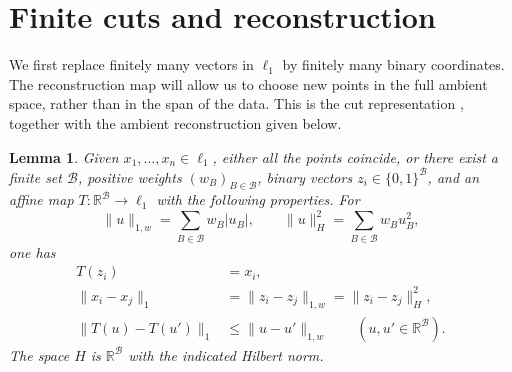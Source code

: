 \documentclass[11pt]{article}
\newtheorem{lemma}[theorem]{Lemma}
\theoremstyle{definition}
\theoremstyle{remark}
\numberwithin{equation}{section}
\newcommand{\R}{\mathbb R}
\begin{document}
\section{Finite cuts and reconstruction}
\label{sec:cuts}

We first replace finitely many vectors in $\ell_1$ by finitely many
binary coordinates. The reconstruction map will allow us to
choose new points in the full ambient space, rather than in the
span of the data. This is the cut representation
\cite[Chapter~4]{DezaLaurent97}, together with the ambient reconstruction
given below.

\begin{lemma}\label{lem:cuts}
Given $x_1,\ldots,x_n\in\ell_1$, either all the points coincide,
or there exist a finite set $\mathcal B$, positive weights
$(w_B)_{B\in\mathcal B}$, binary vectors
$z_i\in\{0,1\}^{\mathcal B}$, and an affine map
$T:\R^{\mathcal B}\to\ell_1$ with the following properties.
For
\[
 \|u\|_{1,w}=\sum_{B\in\mathcal B}w_B|u_B|,
 \qquad
 \|u\|_H^2=\sum_{B\in\mathcal B}w_Bu_B^2,
\]
one has
\begin{align}
 T(z_i)&=x_i,\label{eq:reconstruct}\\
 \|x_i-x_j\|_1
 &=\|z_i-z_j\|_{1,w}=\|z_i-z_j\|_H^2,
 \label{eq:cut-distance}\\
 \|T(u)-T(u')\|_1&\leq\|u-u'\|_{1,w}
 \qquad(u,u'\in\R^{\mathcal B}).\label{eq:contraction}
\end{align}
The space $H$ is $\R^{\mathcal B}$ with the indicated Hilbert norm.
\end{lemma}
\end{document}
